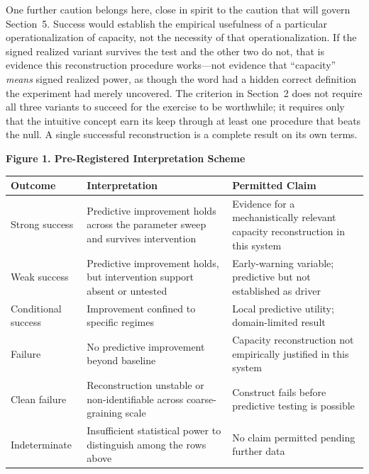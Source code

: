 \documentclass[11pt]{article}
\begin{document}
One further caution belongs here, close in spirit to the caution that will govern Section~5. Success would establish the empirical usefulness of a particular operationalization of capacity, not the necessity of that operationalization. If the signed realized variant survives the test and the other two do not, that is evidence this reconstruction procedure works---not evidence that ``capacity'' \emph{means} signed realized power, as though the word had a hidden correct definition the experiment had merely uncovered. The criterion in Section~2 does not require all three variants to succeed for the exercise to be worthwhile; it requires only that the intuitive concept earn its keep through at least one procedure that beats the null. A single successful reconstruction is a complete result on its own terms.

\bigskip
\begin{center}
\textbf{Figure 1. Pre-Registered Interpretation Scheme}
\end{center}
\begin{center}
\renewcommand{\arraystretch}{1.4}
\begin{tabular}{@{}p{2.6cm}p{5.1cm}p{5.3cm}@{}}
\toprule
\textbf{Outcome} & \textbf{Interpretation} & \textbf{Permitted Claim} \\
\midrule
Strong success & Predictive improvement holds across the parameter sweep and survives intervention & Evidence for a mechanistically relevant capacity reconstruction in this system \\
Weak success & Predictive improvement holds, but intervention support absent or untested & Early-warning variable; predictive but not established as driver \\
Conditional success & Improvement confined to specific regimes & Local predictive utility; domain-limited result \\
Failure & No predictive improvement beyond baseline & Capacity reconstruction not empirically justified in this system \\
Clean failure & Reconstruction unstable or non-identifiable across coarse-graining scale & Construct fails before predictive testing is possible \\
Indeterminate & Insufficient statistical power to distinguish among the rows above & No claim permitted pending further data \\
\bottomrule
\end{tabular}
\end{center}
\bigskip
\end{document}
